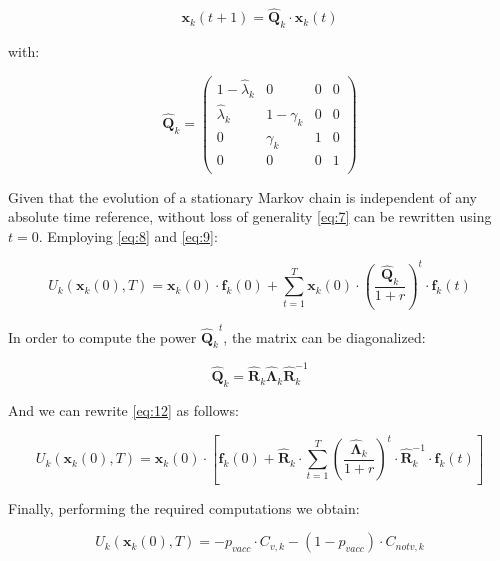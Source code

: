 \documentclass[11pt]{article}
\begin{document}
\begin{equation}\label{eq:10}
	 \mathbf{x}_k(t+1) = \hat{\mathbf{Q}}_k \cdot \mathbf{x}_k(t)
\end{equation}

with:

\begin{equation}\label{eq:11}
	 \hat{\mathbf{Q}}_k = 
	 \left (\begin{array}{cccc} 1-\hat{\lambda}_{k}&0&0&0 \\
	 	\hat{\lambda}_{k}&1-\gamma_{k}&0&0 \\
		0&\gamma_{k}&1&0 \\
		0&0&0&1 \\
	  \end{array} \right)
\end{equation}

Given that the evolution of a stationary Markov chain is independent of any absolute time reference, without loss of generality \eqref{eq:7} can be rewritten using $t = 0$. Employing \eqref{eq:8} and \eqref{eq:9}:

\begin{equation}\label{eq:12}
	U_k(\mathbf{x}_k(0), T)= \mathbf{x}_k(0) \cdot \mathbf{f}_k(0) + \sum_{t=1}^{T} {\mathbf{x}_k(0) \cdot \left(\frac{ \hat{\mathbf{Q}}_k}{1+r}\right)^t \cdot \mathbf{f}_k(t)}
\end{equation}

In order to compute the power \({\hat{\mathbf{Q}}_k}^t\), the matrix can be diagonalized:

\begin{equation}\label{eq:13}
	\hat{\mathbf{Q}}_k=\hat{\mathbf{R}}_{k}\hat{\mathbf{\Lambda}}_{k}\hat{\mathbf{R}}^{-1}_{k}
\end{equation}

And we can rewrite \eqref{eq:12} as follows:

\begin{equation}\label{eq:14}
	U_k(\mathbf{x}_k(0), T)= \mathbf{x}_k(0) \cdot \left[ \mathbf{f}_k(0) + \hat{\mathbf{R}}_{k} \cdot \sum_{t=1}^{T} { \left(\frac{ \hat{\mathbf{\Lambda}}_{k}}{1+r}\right)^t \cdot \hat{\mathbf{R}}^{-1}_{k} \cdot \mathbf{f}_k(t)} \right]
\end{equation}

Finally, performing the required computations we obtain: 

\begin{equation}\label{eq:15}
	U_k(\mathbf{x}_k(0), T)=-p_{vacc} \cdot C_{v,k} - (1-p_{vacc}) \cdot C_{notv,k}
\end{equation}
\end{document}
